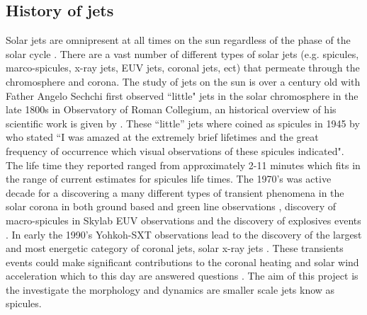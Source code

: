 \documentclass[12pt]{ociamthesis}
\begin{document}
\subsection{History of jets}
\label{subsec:hist_of_jets}
Solar jets are omnipresent at all times on the sun regardless of the phase of the solar cycle \citep{Raouafi2016}. There are a vast number of different types of solar jets (e.g. spicules, marco-spicules, x-ray jets, EUV jets, coronal jets, ect) that permeate through the chromosphere and corona. The study of jets on the sun is over a century old with Father Angelo Sechchi first observed ``little" jets in the solar chromosphere in the late 1800s in Observatory of Roman Collegium, an historical overview of his scientific work is given by \citep{Bruck1979IrAJ}. These ``little'' jets where coined as spicules in 1945 by \cite{Roberts1945ApJ} who stated ``I was amazed at the extremely brief lifetimes and the great frequency of occurrence which visual observations of these spicules indicated". The life time they reported ranged from approximately 2-11 minutes which fits in the range of current estimates for spicules life times. The 1970's was active decade for a discovering a many different types of transient phenomena in the solar corona in both ground based and green line observations \citep{Demastus1973}, discovery of macro-spicules in Skylab EUV observations \citep{Bohlin1975ApJ197L133B, Withbroe1976ApJ} and the discovery of explosives events \cite{Brueckner1980HiA}. In early the 1990's Yohkoh-SXT observations lead to the discovery of the largest and most energetic category of coronal jets, solar x-ray jets \citep{Shibata1992PASJ,Strong1992PASJ}. These transients events could make significant contributions to the coronal heating and solar wind acceleration which to this day are answered questions \citep{Samanta2019Sci, Martinez-Sykora2017, Pontieu2017ApJ, Zuo2019AcASn, Bale2019Natur}. The aim of this project is the investigate the morphology and dynamics are smaller scale jets know as spicules.

\end{document}
